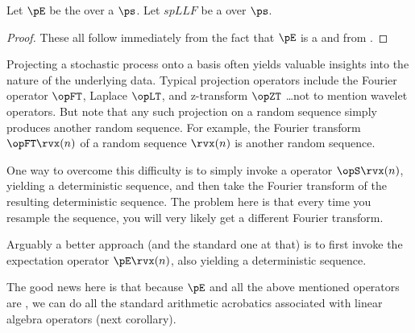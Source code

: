\begin{corollary}
\label{cor:pE_linop}
Let $\pE$ be the  over a  $\ps$.
Let $spLLF$ be a  over $\ps$.
\end{corollary}
\begin{proof}
These all follow immediately from the fact that $\pE$ is a  
and from .
\end{proof}

\begin{remark}
Projecting a stochastic process onto a basis often yields valuable insights 
into the nature of the underlying data. 
Typical projection operators include the Fourier operator $\opFT$, Laplace $\opLT$,
and z-transform $\opZT$ \ldots not to mention wavelet operators.
But note that any such projection on a random sequence simply produces another random sequence.
For example, the Fourier transform $\opFT\rvx(n)$ of a random sequence $\rvx(n)$ is another random 
sequence.

One way to overcome this difficulty is to simply invoke a  operator $\opS\rvx(n)$,
yielding a deterministic sequence, and then take the Fourier transform of the resulting 
deterministic sequence. 
The problem here is that every time you resample the sequence, you will very likely get a 
different Fourier transform.

Arguably a better approach (and the standard one at that) 
is to first invoke the expectation operator $\pE\rvx(n)$, also yielding a deterministic sequence.

The good news here is that because $\pE$ and all the above mentioned operators are , 
we can do all the standard arithmetic acrobatics associated with linear algebra operators (next corollary).
\end{remark}

